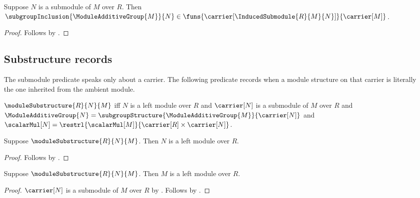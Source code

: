 \begin{proposition}\label{induced_submodule_inclusion_type}
    Suppose $N$ is a submodule of $M$ over $R$.
    Then
        $\subgroupInclusion{\ModuleAdditiveGroup{M}}{N}
            \in\funs{\carrier[\InducedSubmodule{R}{M}{N}]}{
                \carrier[M]}$.
\end{proposition}
\begin{proof}
    Follows by
        .
\end{proof}

\subsection{Substructure records}

The submodule predicate speaks only about a carrier.  The following predicate
records when a module structure on that carrier is literally the one inherited
from the ambient module.

\begin{definition}\label{module_substructure}
    $\moduleSubstructure{R}{N}{M}$ iff
        $N$ is a left module over $R$ and
        $\carrier[N]$ is a submodule of $M$ over $R$ and
        $\ModuleAdditiveGroup{N}
            =\subgroupStructure{\ModuleAdditiveGroup{M}}{\carrier[N]}$ and
        $\scalarMul[N]
            =\restrl{\scalarMul[M]}{
                \carrier[R]\times\carrier[N]}$.
\end{definition}

\begin{proposition}\label{module_substructure_is_module}
    Suppose $\moduleSubstructure{R}{N}{M}$.
    Then $N$ is a left module over $R$.
\end{proposition}
\begin{proof}
    Follows by .
\end{proof}

\begin{proposition}\label{module_substructure_ambient_module}
    Suppose $\moduleSubstructure{R}{N}{M}$.
    Then $M$ is a left module over $R$.
\end{proposition}
\begin{proof}
    $\carrier[N]$ is a submodule of $M$ over $R$ by
        .
    Follows by .
\end{proof}

